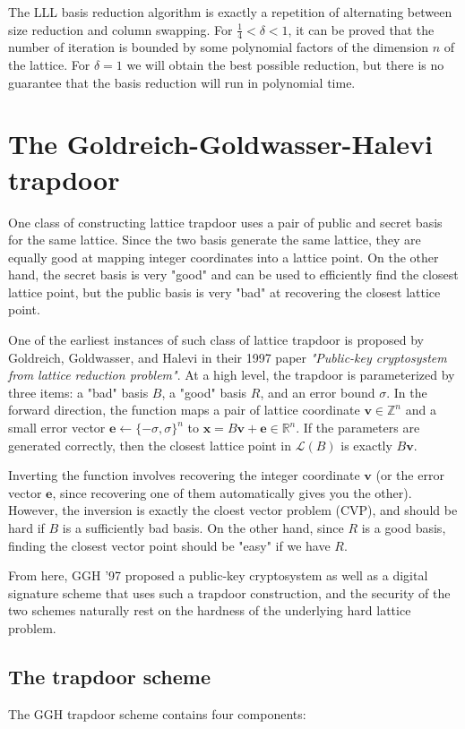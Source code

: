\documentclass[letterpaper,12pt]{article}
\begin{document}
The LLL basis reduction algorithm is exactly a repetition of alternating between size reduction and column swapping. For $\frac{1}{4} < \delta < 1$, it can be proved that the number of iteration is bounded by some polynomial factors of the dimension $n$ of the lattice. For $\delta = 1$ we will obtain the best possible reduction, but there is no guarantee that the basis reduction will run in polynomial time.

\section{The Goldreich-Goldwasser-Halevi trapdoor}
One class of constructing lattice trapdoor uses a pair of public and secret basis for the same lattice. Since the two basis generate the same lattice, they are equally good at mapping integer coordinates into a lattice point. On the other hand, the secret basis is very "good" and can be used to efficiently find the closest lattice point, but the public basis is very "bad" at recovering the closest lattice point.

One of the earliest instances of such class of lattice trapdoor is proposed by Goldreich, Goldwasser, and Halevi in their 1997 paper \textit{"Public-key cryptosystem from lattice reduction problem"}. At a high level, the trapdoor is parameterized by three items: a "bad" basis $B$, a "good" basis $R$, and an error bound $\sigma$. In the forward direction, the function maps a pair of lattice coordinate $\mathbf{v} \in \mathbb{Z}^n$ and a small error vector $\mathbf{e} \leftarrow \{ -\sigma, \sigma \}^n$ to $\mathbf{x} = B\mathbf{v} + \mathbf{e} \in \mathbb{R}^n$. If the parameters are generated correctly, then the closest lattice point in $\mathcal{L}(B)$ is exactly $B\mathbf{v}$.

Inverting the function involves recovering the integer coordinate $\mathbf{v}$ (or the error vector $\mathbf{e}$, since recovering one of them automatically gives you the other). However, the inversion is exactly the cloest vector problem (CVP), and should be hard if $B$ is a sufficiently bad basis. On the other hand, since $R$ is a good basis, finding the closest vector point should be "easy" if we have $R$.

From here, GGH '97 proposed a public-key cryptosystem as well as a digital signature scheme that uses such a trapdoor construction, and the security of the two schemes naturally rest on the hardness of the underlying hard lattice problem.

\subsection{The trapdoor scheme}
The GGH trapdoor scheme contains four components:
\end{document}
